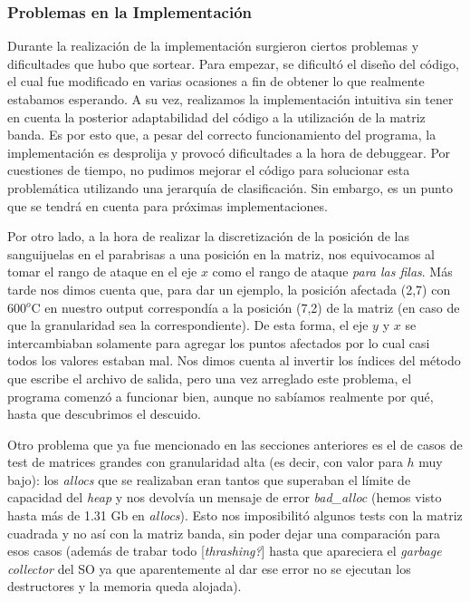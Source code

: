 \subsubsection{Problemas en la Implementación}

\par 
Durante la realización de la implementación surgieron ciertos problemas y dificultades que hubo que sortear. Para empezar, se dificultó el diseño del código, el cual fue modificado en varias ocasiones a fin de obtener lo que realmente estabamos esperando. A su vez, realizamos la implementación intuitiva sin tener en cuenta la posterior adaptabilidad del código a la utilización de la matriz banda. Es por esto que, a pesar del correcto funcionamiento del programa, la implementación es desprolija y provocó dificultades a la hora de debuggear. Por cuestiones de tiempo, no pudimos mejorar el código para solucionar esta problemática utilizando una jerarquía de clasificación. Sin embargo, es un punto que se tendrá en cuenta para próximas implementaciones.

Por otro lado, a la hora de realizar la discretización de la posición de las sanguijuelas en el parabrisas a una posición en la matriz, nos equivocamos al tomar el rango de ataque en el eje $x$ como el rango de ataque \textit{para las filas}. Más tarde nos dimos cuenta que, para dar un ejemplo, la posición afectada (2,7) con 600$^o$C en nuestro output correspondía a la posición (7,2) de la matriz (en caso de que la granularidad sea la correspondiente). De esta forma, el eje $y$ y $x$ se intercambiaban solamente para agregar los puntos afectados por lo cual casi todos los valores estaban mal. Nos dimos cuenta al invertir los índices del método que escribe el archivo de salida, pero una vez arreglado este problema, el programa comenzó a funcionar bien, aunque no sabíamos realmente por qué, hasta que descubrimos el descuido.

Otro problema que ya fue mencionado en las secciones anteriores es el de casos de test de matrices grandes con granularidad alta (es decir, con valor para $h$ muy bajo): los \textit{allocs} que se realizaban eran tantos que superaban el límite de capacidad del \textit{heap} y nos devolvía un mensaje de error \textit{bad\_alloc} (hemos visto hasta más de 1.31 Gb en \textit{allocs}). Esto nos imposibilitó algunos tests con la matriz cuadrada y no así con la matriz banda, sin poder dejar una comparación para esos casos (además de trabar todo [\textit{thrashing?}] hasta que apareciera el \textit{garbage collector} del SO ya que aparentemente al dar ese error no se ejecutan los destructores y la memoria queda alojada).

